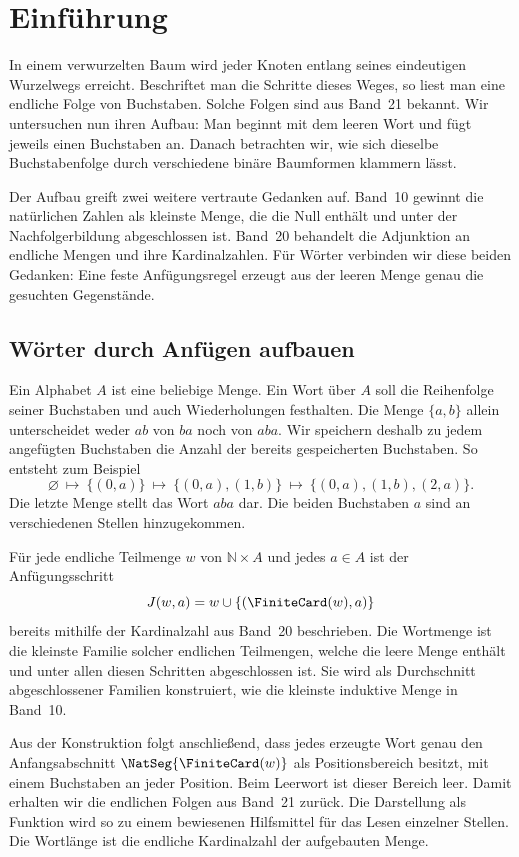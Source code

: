 \documentclass[main.tex]{subfiles}
\begin{document}
\chapter{Einführung}

In einem verwurzelten Baum wird jeder Knoten entlang seines eindeutigen
Wurzelwegs erreicht. Beschriftet man die Schritte dieses Weges, so liest
man eine endliche Folge von Buchstaben. Solche Folgen sind aus Band~21
bekannt. Wir untersuchen nun ihren Aufbau: Man beginnt mit dem leeren
Wort und fügt jeweils einen Buchstaben an. Danach betrachten wir, wie
sich dieselbe Buchstabenfolge durch verschiedene binäre Baumformen
klammern lässt.

Der Aufbau greift zwei weitere vertraute Gedanken auf. Band~10 gewinnt
die natürlichen Zahlen als kleinste Menge, die die Null enthält und
unter der Nachfolgerbildung abgeschlossen ist. Band~20 behandelt die Adjunktion an endliche
Mengen und ihre Kardinalzahlen. Für Wörter verbinden wir diese beiden
Gedanken: Eine feste Anfügungsregel erzeugt aus der leeren Menge genau
die gesuchten Gegenstände.

\section{Wörter durch Anfügen aufbauen}

Ein Alphabet \(A\) ist eine beliebige Menge. Ein Wort über \(A\) soll
die Reihenfolge seiner Buchstaben und auch Wiederholungen festhalten.
Die Menge \(\{a,b\}\) allein unterscheidet weder \(ab\) von \(ba\)
noch von \(aba\). Wir speichern deshalb zu jedem angefügten Buchstaben
die Anzahl der bereits gespeicherten Buchstaben. So entsteht zum Beispiel
\[
 \varnothing\ \longmapsto\ \{(0,a)\}
 \ \longmapsto\ \{(0,a),(1,b)\}
 \ \longmapsto\ \{(0,a),(1,b),(2,a)\}.
\]
Die letzte Menge stellt das Wort \(aba\) dar. Die beiden Buchstaben
\(a\) sind an verschiedenen Stellen hinzugekommen.

Für jede endliche Teilmenge \(w\) von \(\mathbb N\times A\) und
jedes \(a\in A\) ist der Anfügungsschritt
\[
 J(w,a)=w\cup\{(\FiniteCard(w),a)\}
\]
bereits mithilfe der Kardinalzahl aus Band~20 beschrieben. Die
Wortmenge ist die kleinste Familie solcher endlichen Teilmengen, welche
die leere Menge enthält und unter allen diesen Schritten abgeschlossen
ist. Sie wird als Durchschnitt abgeschlossener Familien konstruiert,
wie die kleinste induktive Menge in Band~10.

Aus der Konstruktion folgt anschließend, dass jedes erzeugte Wort
genau den Anfangsabschnitt \(\NatSeg{\FiniteCard(w)}\) als Positionsbereich
besitzt, mit einem Buchstaben an jeder Position. Beim Leerwort ist
dieser Bereich leer. Damit erhalten wir die endlichen Folgen aus Band~21
zurück. Die Darstellung als Funktion wird so zu einem bewiesenen
Hilfsmittel für das Lesen einzelner Stellen. Die Wortlänge ist die
endliche Kardinalzahl der aufgebauten Menge.
\end{document}
